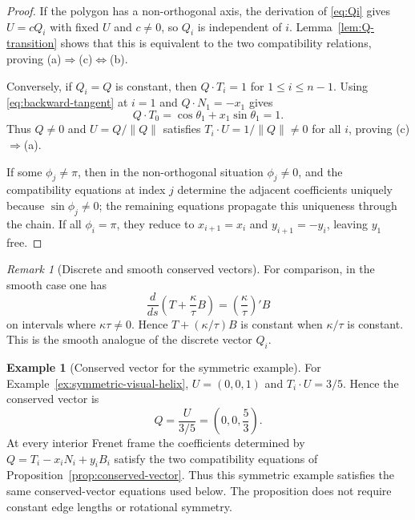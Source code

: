 \documentclass[10pt,a4paper]{amsart}
\theoremstyle{definition}
\newtheorem{example}[theorem]{Example}
\theoremstyle{remark}
\newtheorem{remark}[theorem]{Remark}
\numberwithin{equation}{section}
\begin{document}
\begin{proof}
If the polygon has a non-orthogonal axis, the derivation of \eqref{eq:Qi} gives $U=cQ_i$ with fixed $U$ and $c\ne0$, so $Q_i$ is independent of $i$. Lemma~\ref{lem:Q-transition} shows that this is equivalent to the two compatibility relations, proving \textup{(a)}$\Rightarrow$\textup{(c)}$\Leftrightarrow$\textup{(b)}.

Conversely, if $Q_i=Q$ is constant, then $Q\cdot T_i=1$ for $1\le i\le n-1$. Using \eqref{eq:backward-tangent} at $i=1$ and $Q\cdot N_1=-x_1$ gives
\[
Q\cdot T_0=\cos\theta_1+x_1\sin\theta_1=1.
\]
Thus $Q\ne0$ and $U=Q/\|Q\|$ satisfies $T_i\cdot U=1/\|Q\|\ne0$ for all $i$, proving \textup{(c)}$\Rightarrow$\textup{(a)}.

If some $\phi_j\ne\pi$, then in the non-orthogonal situation $\phi_j\ne0$, and the compatibility equations at index $j$ determine the adjacent coefficients uniquely because $\sin\phi_j\ne0$; the remaining equations propagate this uniqueness through the chain. If all $\phi_i=\pi$, they reduce to $x_{i+1}=x_i$ and $y_{i+1}=-y_i$, leaving $y_1$ free.
\end{proof}

\begin{remark}[Discrete and smooth conserved vectors]
For comparison, in the smooth case one has
\[
\frac{d}{ds}\left(T+\frac{\kappa}{\tau}B\right)
=
\left(\frac{\kappa}{\tau}\right)'B
\]
on intervals where \(\kappa\tau\ne0\). Hence $T+(\kappa/\tau)B$ is constant when $\kappa/\tau$ is constant. This is the smooth analogue of the discrete vector $Q_i$.
\end{remark}


\begin{example}[Conserved vector for the symmetric example]\label{ex:conserved-benchmark}
For Example~\ref{ex:symmetric-visual-helix}, $U=(0,0,1)$ and $T_i\cdot U=3/5$. Hence the conserved vector is
\[
Q=\frac{U}{3/5}=\left(0,0,\frac53\right).
\]
At every interior Frenet frame the coefficients determined by
$Q=T_i-x_iN_i+y_iB_i$ satisfy the two compatibility equations of Proposition~\ref{prop:conserved-vector}. Thus this symmetric example satisfies the same conserved-vector equations used below. The proposition does not require constant edge lengths or rotational symmetry.
\end{example}
\end{document}

